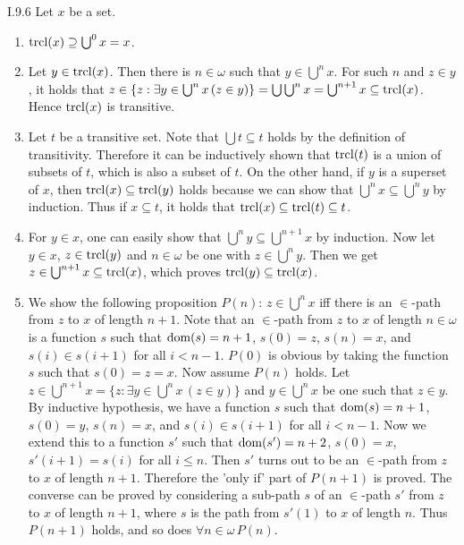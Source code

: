 \documentclass[12pt]{article}
\begin{document}
\begin{customthm}{I.9.6}
  Let $x$ be a set.
  \begin{enumerate}
    \item $\mathop{\mathrm{trcl}}(x)\supseteq\bigcup^0x=x$.
    \item Let $y\in\mathop{\mathrm{trcl}}(x)$. Then there is $n\in\omega$ such that $y\in\bigcup^nx$. For such $n$ and $z\in y$, it holds that $z\in\{z:\exists y\in\bigcup^nx\,(z\in y)\}=\bigcup\bigcup^nx=\bigcup^{n+1}x\subseteq\mathop{\mathrm{trcl}}(x)$. Hence $\mathop{\mathrm{trcl}}(x)$ is transitive.
    \item Let $t$ be a transitive set. Note that $\bigcup t\subseteq t$ holds by the definition of transitivity. Therefore it can be inductively shown that $\mathop{\mathrm{trcl}}(t)$ is a union of subsets of $t$, which is also a subset of $t$. On the other hand, if $y$ is a superset of $x$, then $\mathop{\mathrm{trcl}}(x)\subseteq\mathop{\mathrm{trcl}}(y)$ holds because we can show that $\bigcup^nx\subseteq\bigcup^ny$ by induction. Thus if $x\subseteq t$, it holds that $\mathop{\mathrm{trcl}}(x)\subseteq\mathop{\mathrm{trcl}}(t)\subseteq t$.
    \item For $y\in x$, one can easily show that $\bigcup^ny\subseteq\bigcup^{n+1}x$ by induction. Now let $y\in x$, $z\in\mathop{\mathrm{trcl}}(y)$ and $n\in\omega$ be one with $z\in\bigcup^ny$. Then we get $z\in\bigcup^{n+1}x\subseteq\mathop{\mathrm{trcl}}(x)$, which proves $\mathop{\mathrm{trcl}}(y)\subseteq\mathop{\mathrm{trcl}}(x)$.
    \item We show the following proposition $P(n)$: $z\in\bigcup^nx$ iff there is an $\in$-path from $z$ to $x$ of length $n+1$. Note that an $\in$-path from $z$ to $x$ of length $n\in\omega$ is a function $s$ such that $\mathop{\mathrm{dom}}(s)=n+1$, $s(0)=z$, $s(n)=x$, and $s(i)\in s(i+1)$ for all $i<n-1$. $P(0)$ is obvious by taking the function $s$ such that $s(0)=z=x$. Now assume $P(n)$ holds. Let $z\in\bigcup^{n+1}x=\{z:\exists y\in\bigcup^nx\,(z\in y)\}$ and $y\in\bigcup^n x$ be one such that $z\in y$. By inductive hypothesis, we have a function $s$ such that $\mathop{\mathrm{dom}}(s)=n+1$, $s(0)=y$, $s(n)=x$, and $s(i)\in s(i+1)$ for all $i<n-1$. Now we extend this to a function $s'$ such that $\mathop{\mathrm{dom}}(s')=n+2$, $s(0)=x$, $s'(i+1)=s(i)$ for all $i\leq n$. Then $s'$ turns out to be an $\in$-path from $z$ to $x$ of length $n+1$. Therefore the 'only if' part of $P(n+1)$ is proved. The converse can be proved by considering a sub-path $s$ of an $\in$-path $s'$ from $z$ to $x$ of length $n+1$, where $s$ is the path from $s'(1)$ to $x$ of length $n$. Thus $P(n+1)$ holds, and so does $\forall n\in\omega\,P(n)$.
  \end{enumerate}
\end{customthm}
\end{document}
